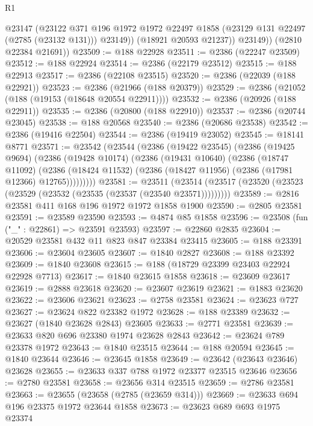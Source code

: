 \begin{lexlean}{R1}
\begin{coremodule}
              @23147
              (@23122
                @371
                @196
                @1972
                @1972
                @22497
                @1858
                (@23129 @131 @22497 (@2785 (@23132 @131)))
                @23149))
            (@18921 @20593 @21237))
          @23149))
      (@2810 @22384 @21691))
@23509 := @188 @22928
@23511 := @2386 (@22247 @23509)
@23512 := @188 @22924
@23514 := @2386 (@22179 @23512)
@23515 := @188 @22913
@23517 := @2386 (@22108 @23515)
@23520 := @2386 (@22039 (@188 @22921))
@23523 := @2386 (@21966 (@188 @20379))
@23529 := @2386 (@21052 (@188 (@19153 (@18648 @20554 @22911))))
@23532 := @2386 (@20926 (@188 @22911))
@23535 := @2386 (@20800 (@188 @22910))
@23537 := @2386 (@20744 @23045)
@23538 := @188 @20568
@23540 := @2386 (@20686 @23538)
@23542 := @2386 (@19416 @22504)
@23544 := @2386 (@19419 @23052)
@23545 := @18141 @8771
@23571 := @23542
    (@23544
      (@2386
        (@19422 @23545)
        (@2386
          (@19425 @9694)
          (@2386
            (@19428 @10174)
            (@2386
              (@19431 @10640)
              (@2386
                (@18747 @11092)
                (@2386 (@18424 @11532) (@2386 (@18427 @11956) (@2386 (@17981 @12366) @12765)))))))))
@23581 := @23511
    (@23514 (@23517 (@23520 (@23523 (@23529 (@23532 (@23535 (@23537 (@23540 @23571)))))))))
@23589 := @2816 @23581 @411 @168 @196 @1972 @1972 @1858 @1900
@23590 := @2805 @23581
@23591 := @23589 @23590
@23593 := @4874 @85 @1858
@23596 := @23508 (fun ("_" : @22861) => @23591 @23593)
@23597 := @22860 @2835
@23604 := @20529 @23581 @432 @11 @823 @847 @23384 @23415
@23605 := @188 @23391
@23606 := @23604 @23605
@23607 := @1840 @2827
@23608 := @188 @23392
@23609 := @1840 @23608
@23615 := @188 (@18729 @23399 @23403 @22924 @22928 @7713)
@23617 := @1840 @23615 @1858
@23618 := @23609 @23617
@23619 := @2888 @23618
@23620 := @23607 @23619
@23621 := @1883 @23620
@23622 := @23606 @23621
@23623 := @2758 @23581
@23624 := @23623 @727
@23627 := @23624 @822 @23382 @1972
@23628 := @188 @23389
@23632 := @23627 (@1840 @23628 @2843) @23605
@23633 := @2771 @23581
@23639 := @23633 @820 @696 @23380 @1974 @23628 @2843
@23642 := @23624 @789 @23378 @1972
@23643 := @1840 @23515
@23644 := @188 @20594
@23645 := @1840 @23644
@23646 := @23645 @1858
@23649 := @23642 (@23643 @23646) @23628
@23655 := @23633 @337 @788 @1972 @23377 @23515 @23646
@23656 := @2780 @23581
@23658 := @23656 @314 @23515
@23659 := @2786 @23581
@23663 := @23655 (@23658 (@2785 (@23659 @314)))
@23669 := @23633 @694 @196 @23375 @1972 @23644 @1858
@23673 := @23623 @689 @693 @1975 @23374

\end{coremodule}
\end{lexlean}
